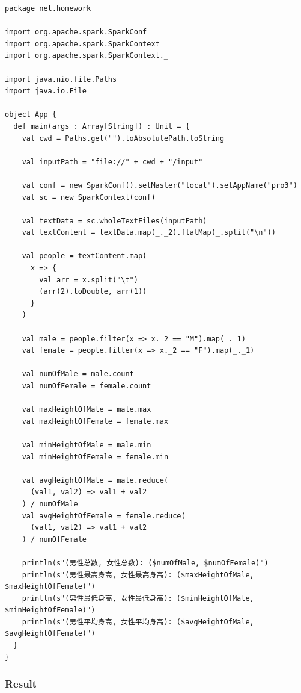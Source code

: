\documentclass{article}
\begin{document}
\begin{center}
\begin{verbatim}
package net.homework

import org.apache.spark.SparkConf
import org.apache.spark.SparkContext
import org.apache.spark.SparkContext._

import java.nio.file.Paths
import java.io.File

object App {
  def main(args : Array[String]) : Unit = {
    val cwd = Paths.get("").toAbsolutePath.toString

    val inputPath = "file://" + cwd + "/input"

    val conf = new SparkConf().setMaster("local").setAppName("pro3")
    val sc = new SparkContext(conf)

    val textData = sc.wholeTextFiles(inputPath)
    val textContent = textData.map(_._2).flatMap(_.split("\n"))

    val people = textContent.map(
      x => {
        val arr = x.split("\t")
        (arr(2).toDouble, arr(1))
      }
    )

    val male = people.filter(x => x._2 == "M").map(_._1)
    val female = people.filter(x => x._2 == "F").map(_._1)

    val numOfMale = male.count
    val numOfFemale = female.count

    val maxHeightOfMale = male.max
    val maxHeightOfFemale = female.max

    val minHeightOfMale = male.min
    val minHeightOfFemale = female.min

    val avgHeightOfMale = male.reduce(
      (val1, val2) => val1 + val2
    ) / numOfMale
    val avgHeightOfFemale = female.reduce(
      (val1, val2) => val1 + val2
    ) / numOfFemale

    println(s"(男性总数, 女性总数): ($numOfMale, $numOfFemale)")
    println(s"(男性最高身高, 女性最高身高): ($maxHeightOfMale, $maxHeightOfFemale)")
    println(s"(男性最低身高, 女性最低身高): ($minHeightOfMale, $minHeightOfFemale)")
    println(s"(男性平均身高, 女性平均身高): ($avgHeightOfMale, $avgHeightOfFemale)")
  }
}
\end{verbatim}
\end{center}

    \subsubsection{Result}
\end{document}
